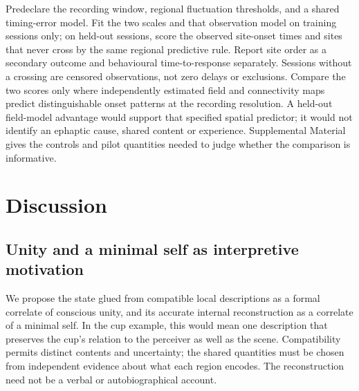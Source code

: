 \documentclass[12pt]{article}
\begin{document}
Predeclare the recording window, regional fluctuation thresholds, and a shared timing-error model. Fit the two scales and that observation model on training sessions only; on held-out sessions, score the observed site-onset times and sites that never cross by the same regional predictive rule. Report site order as a secondary outcome and behavioural time-to-response separately. Sessions without a crossing are censored observations, not zero delays or exclusions. Compare the two scores only where independently estimated field and connectivity maps predict distinguishable onset patterns at the recording resolution. A held-out field-model advantage would support that specified spatial predictor; it would not identify an ephaptic cause, shared content or experience. Supplemental Material gives the controls and pilot quantities needed to judge whether the comparison is informative.

\section{Discussion}

\subsection{Unity and a minimal self as interpretive motivation}
\label{sec:commitment}

We propose the state glued from compatible local descriptions as a formal
correlate of conscious unity, and its accurate internal reconstruction as a
correlate of a minimal self. In the cup example, this would mean one
description that preserves the cup's relation to the perceiver as well as the
scene. Compatibility permits distinct contents and uncertainty; the shared
quantities must be chosen from independent evidence about what each region
encodes. The reconstruction need not be a verbal or autobiographical account.
\end{document}
